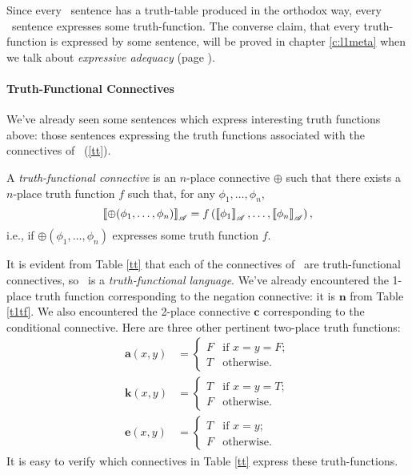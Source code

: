 Since every \lone\ sentence has a truth-table produced in the orthodox way, every \lone\ sentence expresses some truth-function.   The converse claim, that every truth-function is expressed by some sentence, will be proved in chapter \ref{c:l1meta} when we talk about \emph{expressive adequacy} (page \pageref{expressiveadeq}).




\paragraph{Truth-Functional Connectives} We've already seen some sentences which express interesting truth functions above: those  sentences expressing the truth functions associated with the connectives of \lone\ (\autoref{tt}). 
\begin{definition}\label{tfc}
	A \emph{truth-functional connective} is an $n$-place connective $\oplus$ such that there exists a $n$-place truth function $f$ such that, for any $\phi_{1},\ldots,\phi_{n}$, $$\left\llbracket \oplus(\phi_{1},\ldots,\phi_{n})\right\rrbracket_{\mathscr{A}} = f\left(\left\llbracket \phi_{1}\right\rrbracket_{\mathscr{A}},\ldots,\left\llbracket \phi_{n}\right\rrbracket_{\mathscr{A}}\right),$$ i.e., if $\oplus(\phi_{1},\ldots,\phi_{n})$ expresses some truth function $f$. 
\end{definition}
It is evident from Table \ref{tt}  that each of the connectives of \lone\ are truth-functional connectives, so \lone\ is a \emph{truth-functional language}. We've already encountered the 1-place truth function corresponding to the negation connective: it is $\mathbf{n}$ from Table \ref{t1tf}. We also encountered the 2-place connective $\mathbf{c}$ corresponding to the conditional connective. Here are three other pertinent two-place truth functions:
\begin{align*}
	\mathbf{a}(x,y) &= \begin{cases} F &\text{if } x =  y = F;\\ 
T &\text{otherwise}.\end{cases}\\
 \mathbf{k}(x,y) &= \begin{cases} T &\text{if } x = y = T;\\
F &\text{otherwise}.\end{cases}\\
\mathbf{e}(x,y) &= \begin{cases} T &\text{if } x = y;\\
F &\text{otherwise}.\end{cases}
\end{align*}
It is easy to verify which connectives in Table \ref{tt} express these truth-functions.

